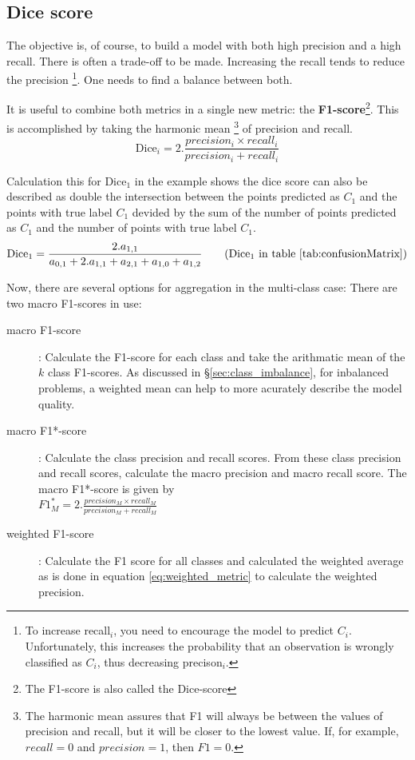 \subsection{Dice score\label{sec:dice}}
\par{
    The objective is, of course, to build a model with both high precision and a high recall.
    There is often a trade-off to be made. 
    Increasing the recall tends to reduce the precision
    \footnote{To increase recall$_i$, you need to encourage the model to predict $C_i$. Unfortunately, this increases the probability that an observation is wrongly classified as $C_i$, thus decreasing precison$_i$.}.
    One needs to find a balance between both.
}
\newpage
\par{It is useful to combine both metrics in a single new metric: the \textbf{F1-score}\footnote{The F1-score is also called the Dice-score}. This is accomplished by taking the harmonic mean
\footnote{The harmonic mean assures that F1 will always be between the values of precision and recall, but it will be closer to the lowest value. If, for example, $recall=0$ and $precision=1$, then $F1=0$.} of precision and recall.
\begin{equation}
    \text{Dice}_i = 2 . \frac{precision_i \times recall_i }{precision_i + recall_i }
\end{equation}
}
\par{
    Calculation this for Dice$_1$ in the example shows the dice score can also be described as double the intersection 
    between the points predicted as $C_1$ and the points with true label $C_1$ devided by the sum of the number of points predicted as $C_1$ and the number of points with true label $C_1$.
    \begin{equation}
        \text{Dice}_1 = \frac{2.a_{1,1}}{a_{0,1} + 2.a_{1,1} + a_{2, 1} + a_{1,0} + a_{1,2}} \tag{Dice$_1$ in table \ref{tab:confusionMatrix}}
    \end{equation}
}
\par{
    Now, there are several options for aggregation in the multi-class case:
    There are two macro F1-scores in use:
    \begin{description}
        \item[macro F1-score]: Calculate the F1-score for each class and take the arithmatic mean of the $k$ class F1-scores. As discussed in §\ref{sec:class_imbalance}, for inbalanced problems, a weighted mean can help to more acurately describe the model quality.
        \item[macro F1*-score]: Calculate the class precision and recall scores. From these class precision and recall scores, calculate the macro precision and macro recall score. 
        The macro F1*-score is given by\\ $F1_M^*=2 . \frac{precision_M \times recall_M }{precision_M + recall_M }$
        \item[weighted F1-score]: Calculate the F1 score for all classes and calculated the weighted average as is done in equation \ref{eq:weighted_metric} to calculate the weighted precision.
    \end{description}
}
